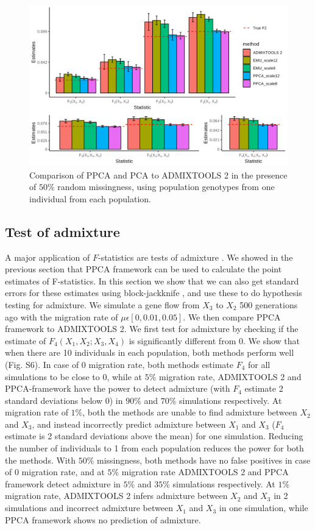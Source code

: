 \documentclass[12pt, letterpaper]{article}
\begin{document}
\begin{figure}[ht!]
    \includegraphics[width=16.5cm]{plots/simfiles/Ne1000/split_times1000/npop10_nind100/missing0.5/plots_8_12/mu0.05_plot_all_1ind_missing.png}
    \centering
    \caption{Comparison of PPCA and PCA to ADMIXTOOLS 2 in the presence of $50\%$ random missingness, using population genotypes from one individual from each population.}
    \label{fig:comparison-adm}
\end{figure}


\subsection{Test of admixture}
A major application of $F$-statistics are tests of admixture \cite{orlando_ancient_2021}. We showed in the previous section that PPCA framework can be used to calculate the point estimates of F-statistics. In this section we show that we can also get standard errors for these estimates using block-jackknife \cite{patterson_modication_nodate}, and use these to do hypothesis testing for admixture. We simulate a gene flow from $X_3$ to $X_2$ 500 generations ago with the migration rate of $\mu \epsilon [0, 0.01, 0.05]$. We then compare PPCA framework to ADMIXTOOLS 2. We first test for admixture by checking if the estimate of $F_4(X_1,X_2;X_3,X_4)$ is significantly different from 0. We show that when there are 10 individuals in each population, both methods perform well (Fig. S6). In case of 0 migration rate, both methods estimate $F_4$ for all simulations to be close to 0, while at $5\%$ migration rate, ADMIXTOOLS 2 and PPCA-framework have the power to detect admixture (with $F_4$ estimate 2 standard deviations below 0) in $90\%$ and $70\%$ simulations respectively. At migration rate of $1\%$, both the methods are unable to find admixture between $X_2$ and $X_3$, and instead incorrectly predict admixture between $X_1$ and $X_3$ ($F_4$ estimate is 2 standard deviations above the mean) for one simulation. Reducing the number of individuals to 1 from each population reduces the power for both the methods. With $50\%$ missingness, both methods have no false positives in case of 0 migration rate, and at $5\%$ migration rate ADMIXTOOLS 2 and PPCA framework detect admixture in $5\%$ and $35\%$ simulations respectively. At $1\%$ migration rate, ADMIXTOOLS 2 infers admixture between $X_2$ and $X_3$ in 2 simulations and incorrect admixture between $X_1$ and $X_3$ in one simulation, while PPCA framework shows no prediction of admixture.
\end{document}
